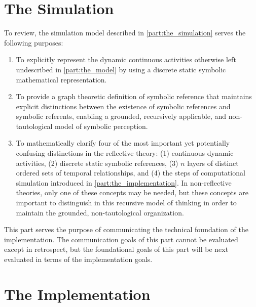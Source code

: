 \section{The Simulation}

To review, the simulation model described in
{\mbox{\autoref{part:the_simulation}}} serves the following purposes:
\begin{enumerate}
\item To explicitly represent the dynamic continuous activities
  otherwise left undescribed in {\mbox{\autoref{part:the_model}}} by
  using a discrete static symbolic mathematical representation.
\item To provide a graph theoretic definition of symbolic reference
  that maintains explicit distinctions between the existence of
  symbolic references and symbolic referents, enabling a grounded,
  recursively applicable, and non-tautological model of symbolic
  perception.
\item To mathematically clarify four of the most important yet
  potentially confusing distinctions in the reflective theory: (1)
  continuous dynamic activities, (2) discrete static symbolic
  references, (3) $n$ layers of distinct ordered sets of temporal
  relationships, and (4) the steps of computational simulation
  introduced in {\mbox{\autoref{part:the_implementation}}}.  In
  non-reflective theories, only one of these concepts may be needed,
  but these concepts are important to distinguish in this recursive
  model of thinking in order to maintain the grounded,
  non-tautological organization.
\end{enumerate}
This part serves the purpose of communicating the technical foundation
of the implementation.  The communication goals of this part cannot be
evaluated except in retrospect, but the foundational goals of this
part will be next evaluated in terms of the implementation goals.

\section{The Implementation}

